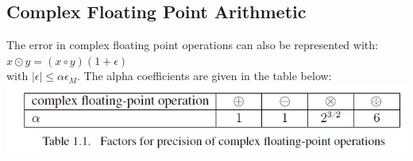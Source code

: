 \documentclass[english]{latex4ei/latex4ei_sheet}
\begin{document}
\begin{sectionbox}

	\subsection{Complex Floating Point Arithmetic}
	The error in complex floating point operations can also be represented with:\\
	$x\odot y= (x\circ y)(1+\epsilon)$\\
	
	with $|\epsilon|\leq \alpha \epsilon_M$. The alpha coefficients are given in the table below:\\
	
		\includegraphics[width=\textwidth]{img/cplx_fl_op.png}

\end{sectionbox}
\end{document}
